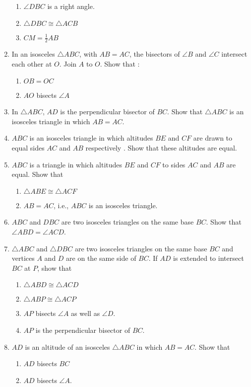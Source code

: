\begin{enumerate}[label=\arabic*.,ref=\thesubsection.\theenumi]
\begin{enumerate}
\item $\angle  DBC$ is a right angle. 
\item $\triangle  DBC \cong  \triangle  ACB$
\item $ CM = \frac{1}{ 2} AB$
\end{enumerate}
%
\item In an isosceles $\triangle ABC$, with $AB = AC$, the bisectors of $\angle B$ and $\angle C$ intersect each other at $O$. Join $A$ to $O$. Show that :
\begin{enumerate} 
\item $OB = OC$ 
\item $AO$ bisects $\angle A$
\end{enumerate}
\item In $\triangle ABC$, $AD$ is the perpendicular bisector of $BC$. Show that $\triangle ABC$ is an isosceles triangle in which $AB = AC$.
\item $ABC$ is an isosceles triangle in which altitudes $BE$ and $CF$ are drawn to equal sides $AC$ and $AB$ respectively . Show that these altitudes are equal.
%
\item $ABC$ is a triangle in which altitudes $BE$ and $CF$ to sides $AC$ and $AB$ are equal. Show that
%
\begin{enumerate} 
\item $\triangle  ABE \cong  \triangle  ACF $
\item  $AB = AC$, i.e., $ABC$ is an isosceles triangle.
\end{enumerate}
%
\item $ABC$ and $DBC$ are two isosceles triangles on the same base $BC$. Show that $\angle ABD = \angle ACD$.
%
\item  $\triangle  ABC$ and $\triangle  DBC$ are two isosceles triangles on the same base $BC$ and vertices $A$ and $D$ are on the same side of $BC$. If $AD$ is extended to intersect $BC$ at $P$, show that
\begin{enumerate}
\item $\triangle  ABD \cong  \triangle  ACD $
\item $\triangle  ABP \cong  \triangle  ACP $
\item $AP$ bisects $\angle  A$ as well as $\angle  D$. 
\item $AP$ is the perpendicular bisector of $BC$.
\end{enumerate}
\item $AD$ is an altitude of an isosceles $\triangle ABC$ in which $AB = AC$. Show that 
\begin{enumerate}
\item $AD$ bisects $BC$
\item $AD$ bisects $\angle  A$. 
\end{enumerate}


\end{enumerate}
